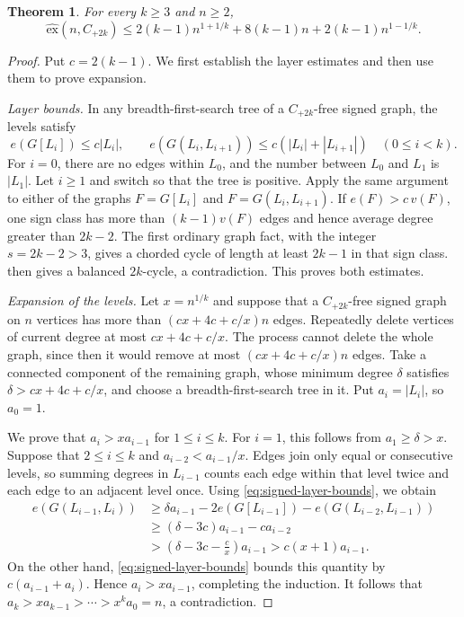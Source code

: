 \documentclass[10pt,a4paper]{amsart}
\newtheorem{theorem}{Theorem}
\newcommand{\ex}{\mathrm{ex}}
\newcommand{\hex}{\widehat{\ex}}
\begin{document}
\begin{theorem}\label{thm:signed-BFS-bound}
For every $k\geq3$ and $n\geq2$,
\[
\hex(n,C_{+2k})\leq
2(k-1)n^{1+1/k}+8(k-1)n+2(k-1)n^{1-1/k}.
\]
\end{theorem}

\begin{proof}
Put $c=2(k-1)$.  We first establish the layer estimates and then use them
to prove expansion.

\emph{Layer bounds.}  In any breadth-first-search tree of a
$C_{+2k}$-free signed graph, the levels satisfy
\begin{equation}\label{eq:signed-layer-bounds}
e(G[L_i])\leq c|L_i|,\qquad
e(G(L_i,L_{i+1}))\leq c(|L_i|+|L_{i+1}|)
\quad(0\leq i<k).
\end{equation}
For $i=0$, there are no edges within $L_0$, and the number between $L_0$
and $L_1$ is $|L_1|$.  Let $i\geq1$ and switch so that the tree is
positive.  Apply the same argument to either of the graphs
$F=G[L_i]$ and $F=G(L_i,L_{i+1})$.  If $e(F)>c\,v(F)$, one sign class
has more than $(k-1)v(F)$ edges and hence average degree greater than
$2k-2$.  The first ordinary graph fact, with the integer $s=2k-2>3$,
gives a chorded cycle of length at least $2k-1$ in that sign class.
 then gives a balanced $2k$-cycle,
a contradiction.  This proves both estimates.

\emph{Expansion of the levels.}  Let $x=n^{1/k}$ and suppose that a
$C_{+2k}$-free signed graph on $n$
vertices has more than $(cx+4c+c/x)n$ edges.  Repeatedly delete vertices
of current degree at most $cx+4c+c/x$.  The process cannot delete the
whole graph, since then it would remove at most $(cx+4c+c/x)n$ edges.
Take a connected component of the remaining graph, whose minimum degree
$\delta$ satisfies $\delta>cx+4c+c/x$, and choose a breadth-first-search
tree in it.  Put $a_i=|L_i|$, so $a_0=1$.

We prove that $a_i>xa_{i-1}$ for $1\leq i\leq k$.  For $i=1$, this
follows from $a_1\geq\delta>x$.  Suppose that $2\leq i\leq k$ and
$a_{i-2}<a_{i-1}/x$.  Edges join only equal or consecutive levels, so
summing degrees in $L_{i-1}$ counts each edge within that level twice and
each edge to an adjacent level once.  Using
\eqref{eq:signed-layer-bounds}, we obtain
\begin{align*}
e(G(L_{i-1},L_i))
&\geq\delta a_{i-1}-2e(G[L_{i-1}])-e(G(L_{i-2},L_{i-1}))\\
&\geq(\delta-3c)a_{i-1}-ca_{i-2}\\
&>\left(\delta-3c-\frac cx\right)a_{i-1}
>c(x+1)a_{i-1}.
\end{align*}
On the other hand, \eqref{eq:signed-layer-bounds} bounds this quantity by
$c(a_{i-1}+a_i)$.  Hence $a_i>xa_{i-1}$, completing the induction.  It
follows that $a_k>xa_{k-1}>\cdots>x^ka_0=n$, a contradiction.
\end{proof}
\end{document}
